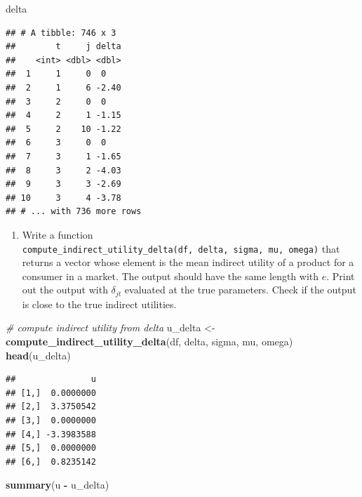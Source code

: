 \documentclass[]{book}
\newenvironment{Shaded}{\begin{snugshade}}{\end{snugshade}}
\newcommand{\KeywordTok}[1]{\textcolor[rgb]{0.13,0.29,0.53}{\textbf{#1}}}
\newcommand{\StringTok}[1]{\textcolor[rgb]{0.31,0.60,0.02}{#1}}
\newcommand{\CommentTok}[1]{\textcolor[rgb]{0.56,0.35,0.01}{\textit{#1}}}
\newcommand{\OperatorTok}[1]{\textcolor[rgb]{0.81,0.36,0.00}{\textbf{#1}}}
\newcommand{\NormalTok}[1]{#1}
\providecommand{\tightlist}{%
  \setlength{\itemsep}{0pt}\setlength{\parskip}{0pt}}
\begin{document}
\begin{Shaded}
\begin{Highlighting}[]
\NormalTok{delta}
\end{Highlighting}
\end{Shaded}

\begin{verbatim}
## # A tibble: 746 x 3
##        t     j delta
##    <int> <dbl> <dbl>
##  1     1     0  0   
##  2     1     6 -2.40
##  3     2     0  0   
##  4     2     1 -1.15
##  5     2    10 -1.22
##  6     3     0  0   
##  7     3     1 -1.65
##  8     3     2 -4.03
##  9     3     3 -2.69
## 10     3     4 -3.78
## # ... with 736 more rows
\end{verbatim}

\begin{enumerate}
\def\labelenumi{\arabic{enumi}.}
\setcounter{enumi}{4}
\tightlist
\item
  Write a function
  \texttt{compute\_indirect\_utility\_delta(df,\ delta,\ sigma,\ mu,\ omega)}
  that returns a vector whose element is the mean indirect utility of a
  product for a consumer in a market. The output should have the same
  length with \(e\). Print out the output with \(\delta_{jt}\) evaluated
  at the true parameters. Check if the output is close to the true
  indirect utilities.
\end{enumerate}

\begin{Shaded}
\begin{Highlighting}[]
\CommentTok{# compute indirect utility from delta}
\NormalTok{u_delta <-}
\StringTok{  }\KeywordTok{compute_indirect_utility_delta}\NormalTok{(df, delta, sigma,}
\NormalTok{                                 mu, omega)}
\KeywordTok{head}\NormalTok{(u_delta)}
\end{Highlighting}
\end{Shaded}

\begin{verbatim}
##               u
## [1,]  0.0000000
## [2,]  3.3750542
## [3,]  0.0000000
## [4,] -3.3983588
## [5,]  0.0000000
## [6,]  0.8235142
\end{verbatim}

\begin{Shaded}
\begin{Highlighting}[]
\KeywordTok{summary}\NormalTok{(u }\OperatorTok{-}\StringTok{ }\NormalTok{u_delta)}
\end{Highlighting}
\end{Shaded}
\end{document}
